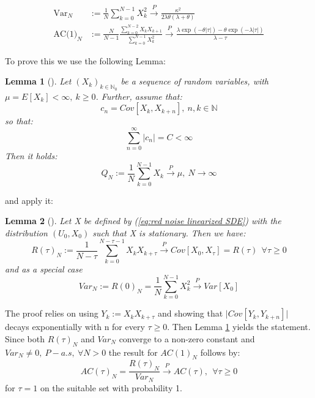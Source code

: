 \documentclass[%
thesis=student,%
coverpage=false,%
titlepage=false,%
headmarks=true, %
english,%
font=libertine, %
math=newpxtx, %
BCOR=5mm,%
coverBCOR=11mm%
]{tumbook}
\newtheorem{lemma}{Lemma}
\begin{document}
\begin{subequations}
        \begin{align*}
            \text{Var}_{N} &:= \frac{1}{N}\sum_{k=0}^{N-1}X_{k}^{2} \xrightarrow{P} \frac{\kappa^{2}}{2\lambda\theta(\lambda + \theta)} \\
            \text{AC(1)}_{N} &:= \frac{N}{N-1}\frac{\sum_{k=0}^{N-2}X_{k}X_{k+1}}{\sum_{k=0}^{N-1}X_{k}^{2}} \xrightarrow{P} \frac{\lambda\exp(-\theta\lvert\tau\rvert) - \theta\exp(-\lambda\lvert\tau\rvert)}{\lambda - \tau}
        \end{align*}
\end{subequations}

To prove this we use the following Lemma:

\begin{lemma}[\cite{Morr:2024SM}]
    Let $(X_{k})_{k\in \mathbb{N}_{0}}$ be a sequence of random variables, with $\mu = E[X_{k}] < \infty, \ k \geq 0$. Further, assume that: 
    \[
    c_{n} = Cov[X_{k},X_{k+n}], \ n, k \in \mathbb{N}
    \]
    so that:
    \[
    \sum_{n=0}^{\infty}\lvert c_{n} \rvert = C < \infty
    \]
    Then it holds:
    \[
    Q_{N} := \frac{1}{N}\sum_{k=0}^{N-1}X_{k} \xrightarrow{P} \mu, \ N \rightarrow \infty
    \]
    \label{lemma:summable covariance}
\end{lemma}

and apply it:

\begin{lemma}[\cite{Morr:2024SM}]
    Let X be defined by (\ref{eq:red noise linearized SDE}) with the distribution $(U_{0},X_{0})$ such that X is stationary. Then we have:
    \[
    R(\tau)_{N} := \frac{1}{N-\tau} \sum_{k=0}^{N-\tau -1} X_{k}X_{k+\tau} \xrightarrow{P} Cov[X_{0},X_{\tau}] = R(\tau) \ \ \forall \tau \geq 0
    \]
    and as a special case
    \[
    Var_{N} := R(0)_{N} = \frac{1}{N} \sum_{k=0}^{N-1} X_{k}^{2} \xrightarrow{P}Var[X_{0}]
    \]
    \label{lemma: consistent estimator proof}
\end{lemma}

The proof relies on using $Y_{k} := X_{k}X_{k+\tau}$ and showing that $\lvert Cov[Y_{k},Y_{k+n}] \rvert$ decays exponentially with n for every $\tau \geq 0$. Then Lemma \ref{lemma:summable covariance} yields the statement. Since both $R(\tau)_{N}$ and $Var_{N}$ converge to a non-zero constant and $Var_N \neq 0, \ P-a.s, \ \forall N > 0$ the result for $AC(1)_{N}$ follows by:
\[
AC(\tau)_N = \frac{R(\tau)_{N}}{Var_{N}} \xrightarrow{P} AC(\tau), \ \ \forall \tau \geq 0
\]
for $\tau = 1$ on the suitable set with probability 1.
\end{document}

